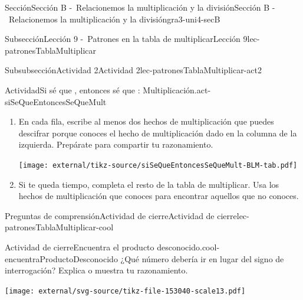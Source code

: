 \begin{sectionptx}{Sección}{Sección B -~Relacionemos la multiplicación y la división}{}{Sección B -~Relacionemos la multiplicación y la división}{}{}{gra3-uni4-secB}
\begin{subsectionptx}{Subsección}{Lección 9 -~Patrones en la tabla de multiplicar}{}{Lección 9}{}{}{lec-patronesTablaMultiplicar}
%
%
\typeout{************************************************}
\typeout{************************************************}
%
\begin{subsubsectionptx}{Subsubsección}{Actividad 2}{}{Actividad 2}{}{}{lec-patronesTablaMultiplicar-act2}
\begin{activity}{Actividad}{Si sé que \textellipsis{}, entonces sé que \textellipsis{}: Multiplicación.}{act-siSeQueEntoncesSeQueMult}%
%
\begin{enumerate}
\item{}En cada fila, escribe al menos dos hechos de multiplicación que puedes descifrar porque conoces el hecho de multiplicación dado en la columna de la izquierda. Prepárate para compartir tu razonamiento.%
\begin{image}{0}{1}{0}{}%
\texttt{[image: external/tikz-source/siSeQueEntoncesSeQueMult-BLM-tab.pdf]}
\end{image}%
\item{}Si te queda tiempo, completa el resto de la tabla de multiplicar. Usa los hechos de multiplicación que conoces para encontrar aquellos que no conoces.%
\end{enumerate}
\end{activity}%
\end{subsubsectionptx}
%
%
\typeout{************************************************}
\typeout{************************************************}
%
\clearpage
\begin{reading-questions-subsubsection}{Preguntas de comprensión}{Actividad de cierre}{}{Actividad de cierre}{}{}{lec-patronesTablaMultiplicar-cool}
\begin{project}{Actividad de cierre}{Encuentra el producto desconocido.}{cool-encuentraProductoDesconocido}%
¿Qué número debería ir en lugar del signo de interrogación? Explica o muestra tu razonamiento.%
\begin{image}{0}{1}{0}{}%
\texttt{[image: external/svg-source/tikz-file-153040-scale13.pdf]}
\end{image}%
\end{project}%
\end{reading-questions-subsubsection}
\end{subsectionptx}
%
%
\typeout{************************************************}

\end{sectionptx}

